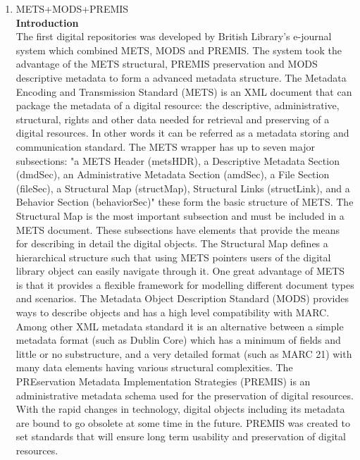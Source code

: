 \begin{enumerate}
	\item METS+MODS+PREMIS\\
	{\bf Introduction}\\
		The first digital repositories was developed by British Library's e-journal system which combined METS, MODS and PREMIS.\cite{Dappert2008} 
		The system took the advantage of the METS structural, PREMIS preservation and MODS descriptive metadata to form a advanced metadata structure. 
		The Metadata Encoding and Transmission Standard (METS) is an XML document that can package the metadata of a digital resource: 
		the descriptive, administrative, structural, rights and other data needed for retrieval and preserving of a digital resources.\cite{Guenther2003} 
		In other words it can be referred as a metadata storing and communication standard. The METS wrapper has up to seven major subsections: 
		"a METS Header (metsHDR), a Descriptive Metadata Section (dmdSec), an Administrative Metadata Section (amdSec), a File Section (fileSec), 
		a Structural Map (structMap), Structural Links (structLink), and a Behavior Section (behaviorSec)" these form the basic structure of METS. 
		The Structural Map is the most important subsection and must be included in a METS document.\cite{Cheslow2014} 
		These subsections have elements that provide the means for describing in detail the digital objects. 
		The Structural Map defines a hierarchical structure such that using METS pointers users of the digital library object can easily navigate through it. 
		One great advantage of METS is that it provides a flexible framework for modelling different document types and scenarios.\cite{Dappert2008}
		The Metadata Object Description Standard (MODS) provides ways to describe objects and has a high level compatibility with MARC. 
		Among other XML metadata standard it is an alternative between a simple metadata format (such as Dublin Core) 
		which has a minimum of fields and little or no substructure, and a very detailed format (such as MARC 21) with many data elements having various structural complexities.\cite{Guenther2003}
		The PREservation Metadata Implementation Strategies (PREMIS) is an administrative metadata schema used for the preservation of digital resources.\cite{Cheslow2014} 
		With the rapid changes in technology, digital objects including its metadata are bound to go obsolete at some time in the future. 
		PREMIS was created to set standards that will ensure long term usability and preservation of digital resources.
	

\end{enumerate}
